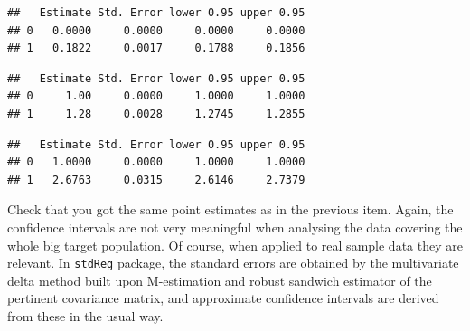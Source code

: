 \documentclass[
]{book}
\newenvironment{Shaded}{\begin{snugshade}}{\end{snugshade}}
\newcommand{\AttributeTok}[1]{\textcolor[rgb]{0.13,0.29,0.53}{#1}}
\newcommand{\DecValTok}[1]{\textcolor[rgb]{0.00,0.00,0.81}{#1}}
\newcommand{\FunctionTok}[1]{\textcolor[rgb]{0.13,0.29,0.53}{\textbf{#1}}}
\newcommand{\NormalTok}[1]{#1}
\newcommand{\SpecialCharTok}[1]{\textcolor[rgb]{0.81,0.36,0.00}{\textbf{#1}}}
\newcommand{\StringTok}[1]{\textcolor[rgb]{0.31,0.60,0.02}{#1}}
\begin{document}
\begin{Shaded}
\end{Shaded}

\begin{verbatim}
##   Estimate Std. Error lower 0.95 upper 0.95
## 0   0.0000     0.0000     0.0000     0.0000
## 1   0.1822     0.0017     0.1788     0.1856
\end{verbatim}

\begin{Shaded}
\end{Shaded}

\begin{verbatim}
##   Estimate Std. Error lower 0.95 upper 0.95
## 0     1.00     0.0000     1.0000     1.0000
## 1     1.28     0.0028     1.2745     1.2855
\end{verbatim}

\begin{Shaded}
\end{Shaded}

\begin{verbatim}
##   Estimate Std. Error lower 0.95 upper 0.95
## 0   1.0000     0.0000     1.0000     1.0000
## 1   2.6763     0.0315     2.6146     2.7379
\end{verbatim}

Check that you got the same point estimates as in the previous item.
Again, the confidence intervals are not very meaningful when analysing
the data covering the whole big target population. Of course, when
applied to real sample data they are relevant. In \texttt{stdReg} package, the
standard errors are obtained by the multivariate delta method built upon
M-estimation and robust sandwich estimator of the pertinent covariance
matrix, and approximate confidence intervals are derived from these in
the usual way.
\end{document}
